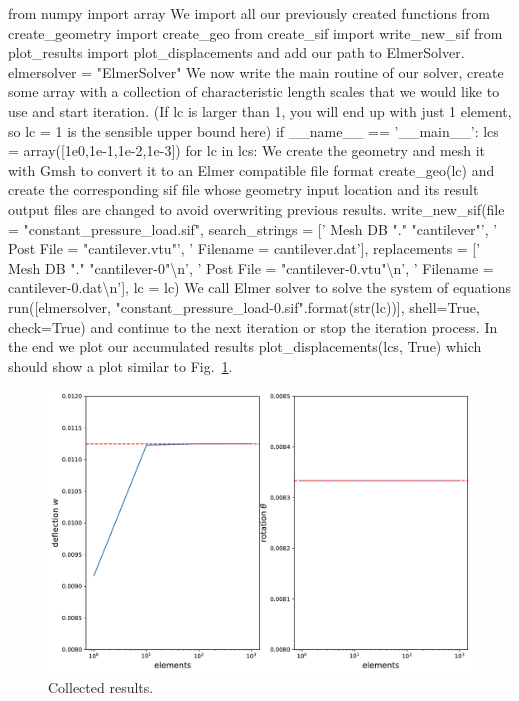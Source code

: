 from numpy import array
\ttend 
We import all our previously created functions
\ttbegin
from create_geometry import create_geo
from create_sif import write_new_sif
from plot_results import plot_displacements
\ttend 
and add our path to ElmerSolver.
\ttbegin
elmersolver = "ElmerSolver"
\ttend 
We now write the main routine of our solver, create some array with a collection of characteristic length scales that we would like to use and start iteration. (If lc is larger than 1, you will end up with just 1 element, so lc = 1 is the sensible upper bound here)
\ttbegin
if __name__ == '__main__':
    lcs = array([1e0,1e-1,1e-2,1e-3])
    for lc in lcs:
\ttend 
We create the geometry and mesh it with Gmsh to convert it to an Elmer compatible file format
\ttbegin
        create_geo(lc)
\ttend 
and create the corresponding sif file whose geometry input location and its result output files are changed to avoid overwriting previous results.
\ttbegin
        write_new_sif(file = "constant_pressure_load.sif", 
                      search_strings = ['  Mesh DB "." "cantilever"',
                                 '  Post File = "cantilever.vtu"',
                                 '  Filename = cantilever.dat'], 
                      replacements = ['  Mesh DB "." "cantilever-{0}"\textbackslash n',
                                 '  Post File = "cantilever-{0}.vtu"\textbackslash n',
                                 '  Filename = cantilever-{0}.dat\textbackslash n'],
                      lc = lc)
\ttend 
We call Elmer solver to solve the system of equations
\ttbegin
        run([elmersolver,
             "constant_pressure_load-{0}.sif".format(str(lc))],
            shell=True, 
            check=True)
\ttend 
and continue to the next iteration or stop the iteration process. In the end we plot our accumulated results
\ttbegin
    plot_displacements(lcs, True) 
\ttend
which should show a plot similar to Fig.\ \ref{fig:timoshenko-results}. 

\begin{figure}[hbt]
  \centerline{\includegraphics[width=1.0\textwidth]{nr-elements-displacements.pdf}}
  \caption{Collected results.} 
  \label{fig:timoshenko-results}
\end{figure}

